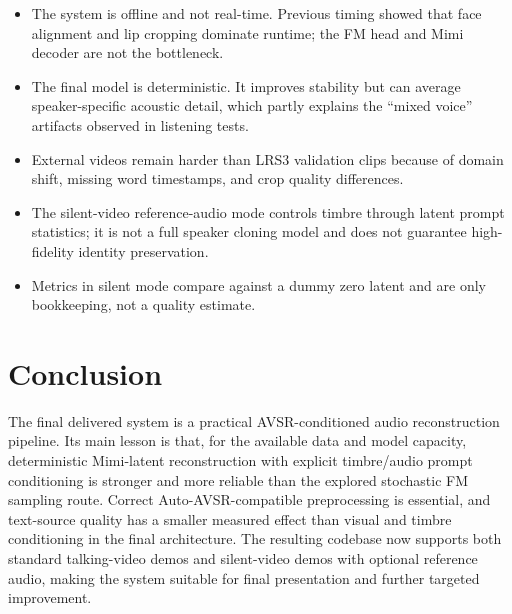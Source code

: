 \documentclass{article}
\begin{document}
\begin{itemize}
    \item The system is offline and not real-time. Previous timing showed that
    face alignment and lip cropping dominate runtime; the FM head and Mimi
    decoder are not the bottleneck.
    \item The final model is deterministic. It improves stability but can
    average speaker-specific acoustic detail, which partly explains the
    ``mixed voice'' artifacts observed in listening tests.
    \item External videos remain harder than LRS3 validation clips because of
    domain shift, missing word timestamps, and crop quality differences.
    \item The silent-video reference-audio mode controls timbre through latent
    prompt statistics; it is not a full speaker cloning model and does not
    guarantee high-fidelity identity preservation.
    \item Metrics in silent mode compare against a dummy zero latent and are
    only bookkeeping, not a quality estimate.
\end{itemize}

\section{Conclusion}

The final delivered system is a practical AVSR-conditioned audio reconstruction
pipeline. Its main lesson is that, for the available data and model capacity,
deterministic Mimi-latent reconstruction with explicit timbre/audio prompt
conditioning is stronger and more reliable than the explored stochastic FM
sampling route. Correct Auto-AVSR-compatible preprocessing is essential, and
text-source quality has a smaller measured effect than visual and timbre
conditioning in the final architecture. The resulting codebase now supports
both standard talking-video demos and silent-video demos with optional reference
audio, making the system suitable for final presentation and further targeted
improvement.
\end{document}
